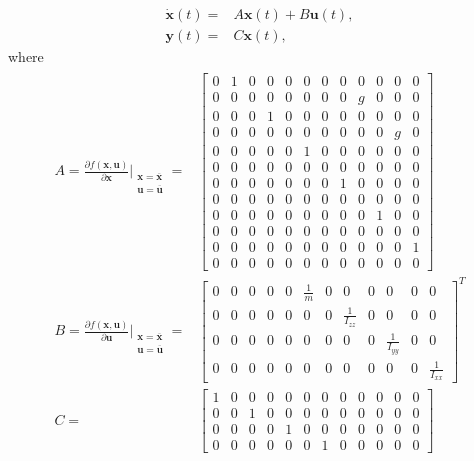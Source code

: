 \begin{align*}
\dot{\mathbf{x}}(t) = & A\mathbf{x}(t)+B\mathbf{u}(t),\\
\mathbf{y}(t) = & C\mathbf{x}(t),
\end{align*}
where
\begin{align}
\begin{split}
A  = \frac{\partial f(\mathbf{x},\mathbf{u})}{\partial \mathbf{x}}\Bigr|_{\substack{\mathbf{x}=\overline{\mathbf{x}}\\\mathbf{u}=\overline{\mathbf{u}}}} = & 
\begin{bmatrix}
0 & 1 & 0 & 0 & 0 & 0 & 0 & 0 & 0 & 0 & 0 & 0\\[2px]
0 & 0 & 0 & 0 & 0 & 0 & 0 & 0 & g & 0 & 0 & 0\\[2px]
0 & 0 & 0 & 1 & 0 & 0 & 0 & 0 & 0 & 0 & 0 & 0\\[2px]
0 & 0 & 0 & 0 & 0 & 0 & 0 & 0 & 0 & 0 & g & 0\\[2px]
0 & 0 & 0 & 0 & 0 & 1 & 0 & 0 & 0 & 0 & 0 & 0\\[2px]
0 & 0 & 0 & 0 & 0 & 0 & 0 & 0 & 0 & 0 & 0 & 0\\[2px]
0 & 0 & 0 & 0 & 0 & 0 & 0 & 1 & 0 & 0 & 0 & 0\\[2px]
0 & 0 & 0 & 0 & 0 & 0 & 0 & 0 & 0 & 0 & 0 & 0\\[2px]
0 & 0 & 0 & 0 & 0 & 0 & 0 & 0 & 0 & 1 & 0 & 0\\[2px]
0 & 0 & 0 & 0 & 0 & 0 & 0 & 0 & 0 & 0 & 0 & 0\\[2px]
0 & 0 & 0 & 0 & 0 & 0 & 0 & 0 & 0 & 0 & 0 & 1\\[2px]
0 & 0 & 0 & 0 & 0 & 0 & 0 & 0 & 0 & 0 & 0 & 0
\end{bmatrix} \\[15px]
B = \frac{\partial f(\mathbf{x},\mathbf{u})}{\partial \mathbf{u}}\Bigr|_{\substack{\mathbf{x}=\overline{\mathbf{x}}\\\mathbf{u}=\overline{\mathbf{u}}}} = & 
\begin{bmatrix}
0 & 0 & 0 & 0 & 0 & \frac{1}{m} & 0 & 0 & 0 & 0 & 0 & 0\\[5px]
0 & 0 & 0 & 0 & 0 & 0 & 0 & \frac{1}{I_{zz}} & 0 & 0 & 0 & 0\\[5px]
0 & 0 & 0 & 0 & 0 & 0 & 0 & 0 & 0 & \frac{1}{I_{yy}} & 0 & 0\\[5px]
0 & 0 & 0 & 0 & 0 & 0 & 0 & 0 & 0 & 0 & 0 & \frac{1}{I_{xx}}
\end{bmatrix}^T \\[15px]
C = &
\begin{bmatrix}
1 & 0 & 0 & 0 & 0 & 0 & 0 & 0 & 0 & 0 & 0 & 0\\
0 & 0 & 1 & 0 & 0 & 0 & 0 & 0 & 0 & 0 & 0 & 0\\
0 & 0 & 0 & 0 & 1 & 0 & 0 & 0 & 0 & 0 & 0 & 0\\
0 & 0 & 0 & 0 & 0 & 0 & 1 & 0 & 0 & 0 & 0 & 0 
\end{bmatrix}
\end{split}
\end{align}

